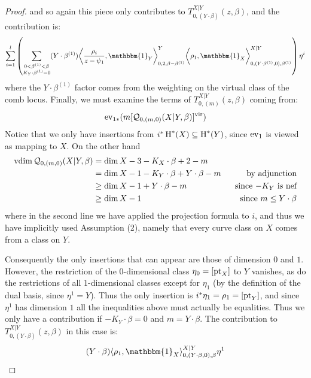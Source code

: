 \begin{proof}
and so again this piece only contributes to $T_{0,(Y\cdot\beta)}^{X|Y}(z,\beta)$, and the contribution is:
\begin{equation*} \sum_{i=1}^l \left( \sum_{\substack{0 < \beta^{(1)} < \beta \\ K_Y \cdot \beta^{(1)}=0}} (Y \cdot \beta^{(1)}) \bigg\langle \dfrac{\rho_i}{z-\psi_1}, \mathbbm{1}_Y \bigg\rangle_{0,2,\beta-\beta^{(1)}}^Y \bigg\langle \rho_1, \mathbbm{1}_X \bigg\rangle_{0,(Y \cdot \beta^{(1)},0),\beta^{(1)}}^{X|Y} \right) \eta^i \end{equation*}
where the $Y \cdot \beta^{(1)}$ factor comes from the weighting on the virtual class of the comb locus. Finally, we must examine the terms of $T_{0,(m)}^{X|Y}(z,\beta)$ coming from:
\begin{equation*}\operatorname{ev}_{1*}(m[\mathcal{Q}_{0,(m,0)}(X|Y,\beta)]^{\mathrm{vir}})\end{equation*} 
Notice that we only have insertions from $i^*\operatorname{H}^*(X) \subseteq \operatorname{H}^*(Y)$, since $\operatorname{ev}_1$ is viewed as mapping to $X$. On the other hand
\begin{align*} \operatorname{vdim} \mathcal{Q}_{0,(m,0)}(X|Y,\beta) & = \dim X-3 -K_X \cdot \beta +2-m & \\
& = \dim X - 1 -K_Y \cdot \beta + Y \cdot \beta - m \ \ & \text{by adjunction} \\
& \geq \dim X - 1 + Y\cdot\beta - m \ \ & \text{since $-K_Y$ is nef} \\
& \geq \dim X - 1 \ \ & \text{since $m \leq Y \cdot \beta$} \end{align*}
where in the second line we have applied the projection formula to $i$, and thus we have implicitly used Assumption (2), namely that every curve class on $X$ comes from a class on $Y$.

Consequently the only insertions that can appear are those of dimension $0$ and $1$. However, the restriction of the $0$-dimensional class $\eta_0 = [\operatorname{pt}_X]$ to $Y$ vanishes, as do the restrictions of all $1$-dimensional classes except for $\eta_1$ (by the definition of the dual basis, since $\eta^1 = Y$). Thus the only insertion is $i^*\eta_1=\rho_1=[\operatorname{pt}_Y]$, and since $\eta^1$ has dimension $1$ all the inequalities above must actually be equalities. Thus we only have a contribution if $-K_Y \cdot \beta = 0$ and $m = Y \cdot \beta$. The contribution to $T_{0,(Y\cdot\beta)}^{X|Y}(z,\beta)$ in this case is:
\begin{equation*} (Y \cdot \beta) \langle \rho_1 , \mathbbm{1}_X \rangle_{0,(Y \cdot \beta,0),\beta}^{X|Y} \eta^1 \end{equation*}


\end{proof}
